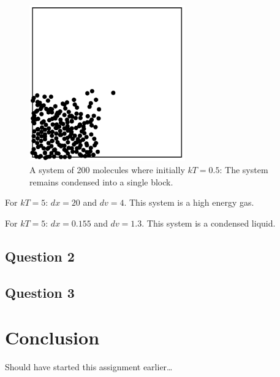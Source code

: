 \documentclass{article}
\begin{document}
\begin{figure}[!htb]
	\begin{center}
		\includegraphics[width=0.6\textwidth]{05kT_thermalized.pdf}
	\end{center}
	\caption{A system of 200 molecules where initially $kT = 0.5$: The system remains condensed into a single block.}
\label{fig:qual}
\end{figure}
\FloatBarrier

For $kT = 5$: $dx = 20$ and $dv = 4$. This system is a high energy gas.

For $kT = 5$: $dx = 0.155$ and $dv = 1.3$. This system is a condensed liquid.

\subsection{Question 2}



\subsection{Question 3}


\section{Conclusion}

Should have started this assignment earlier\ldots
\end{document}
